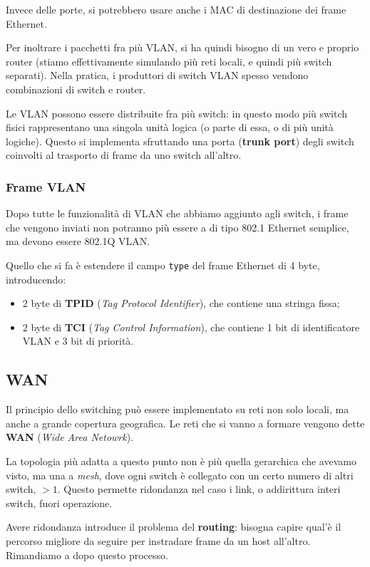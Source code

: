 \documentclass[a4paper,11pt]{article}
\begin{document}
Invece delle porte, si potrebbero usare anche i MAC di destinazione dei frame Ethernet.

Per inoltrare i pacchetti fra più VLAN, si ha quindi bisogno di un vero e proprio router (stiamo effettivamente simulando più reti locali, e quindi più switch separati). Nella pratica, i produttori di switch VLAN spesso vendono combinazioni di switch e router.

Le VLAN possono essere distribuite fra più switch: in questo modo più switch fisici rappresentano una singola unità logica (o parte di essa, o di più unità logiche).
Questo si implementa sfruttando una porta (\textbf{trunk port}) degli switch coinvolti al trasporto di frame da uno switch all'altro. 

\subsubsection{Frame VLAN}
Dopo tutte le funzionalità di VLAN che abbiamo aggiunto agli switch, i frame che vengono inviati non potranno più essere a di tipo 802.1 Ethernet semplice, ma devono essere 802.1Q VLAN.

Quello che si fa è estendere il campo \lstinline|type| del frame Ethernet di 4 byte, introducendo:
\begin{itemize}
	\item 2 byte di \textbf{TPID} (\textit{Tag Protocol Identifier}), che contiene una stringa fissa;
	\item 2 byte di \textbf{TCI} (\textit{Tag Control Information}), che contiene 1 bit di identificatore VLAN e 3 bit di priorità.
\end{itemize}

\subsection{WAN}
Il principio dello switching può essere implementato su reti non solo locali, ma anche a grande copertura geografica.
Le reti che si vanno a formare vengono dette \textbf{WAN} (\textit{Wide Area Netowrk}).

La topologia più adatta a questo punto non è più quella gerarchica che avevamo visto, ma una a \textit{mesh}, dove ogni switch è collegato con un certo numero di altri switch, $> 1$. Questo permette ridondanza nel caso i link, o addirittura interi switch, fuori operazione.

Avere ridondanza introduce il problema del \textbf{routing}: bisogna capire qual'è il percorso migliore da seguire per instradare frame da un host all'altro. 
Rimandiamo a dopo questo processo.
\end{document}
